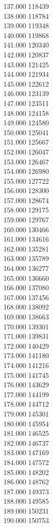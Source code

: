 { 137.000	118439 \\
 138.000	118784 \\
 139.000	119348 \\
 140.000	119868 \\
 141.000	120340 \\
 142.000	120837 \\
 143.000	121425 \\
 144.000	121934 \\
 145.000	122612 \\
 146.000	123139 \\
 147.000	123511 \\
 148.000	124158 \\
 149.000	124580 \\
 150.000	125041 \\
 151.000	125667 \\
 152.000	126047 \\
 153.000	126467 \\
 154.000	126980 \\
 155.000	127722 \\
 156.000	128300 \\
 157.000	128674 \\
 158.000	129175 \\
 159.000	129767 \\
 160.000	130466 \\
 161.000	134616 \\
 162.000	135281 \\
 163.000	135789 \\
 164.000	136277 \\
 165.000	136660 \\
 166.000	137080 \\
 167.000	137456 \\
 168.000	138092 \\
 169.000	138663 \\
 170.000	139301 \\
 171.000	139831 \\
 172.000	140429 \\
 173.000	141180 \\
 174.000	141216 \\
 175.000	141745 \\
 176.000	143629 \\
 177.000	144199 \\
 178.000	144712 \\
 179.000	145301 \\
 180.000	145954 \\
 181.000	146525 \\
 182.000	146737 \\
 183.000	147169 \\
 184.000	147572 \\
 185.000	148202 \\
 186.000	148762 \\
 187.000	149373 \\
 188.000	149585 \\
 189.000	150231 \\
 190.000	150753 \\
}
